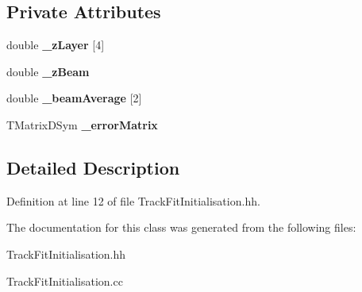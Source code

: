 \subsection*{Private Attributes}
\begin{DoxyCompactItemize}
\item 
double {\bfseries \_\-zLayer} [4]\label{classTBTrack_1_1TrackFitInitialisation_a6511a2ca609053513dccf4fff7900382}

\item 
double {\bfseries \_\-zBeam}\label{classTBTrack_1_1TrackFitInitialisation_aa15b79ff7fdac5ab332807bacde256e6}

\item 
double {\bfseries \_\-beamAverage} [2]\label{classTBTrack_1_1TrackFitInitialisation_a1fae67345661eeda08ad32937ae17e67}

\item 
TMatrixDSym {\bfseries \_\-errorMatrix}\label{classTBTrack_1_1TrackFitInitialisation_aa5d51d04eccb5d362c70d9bd2e51f765}

\end{DoxyCompactItemize}


\subsection{Detailed Description}


Definition at line 12 of file TrackFitInitialisation.hh.

The documentation for this class was generated from the following files:\begin{DoxyCompactItemize}
\item 
TrackFitInitialisation.hh\item 
TrackFitInitialisation.cc\end{DoxyCompactItemize}
